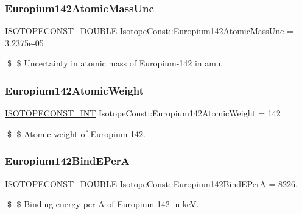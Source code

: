 \subsubsection{\texorpdfstring{Europium142\+Atomic\+Mass\+Unc}{Europium142AtomicMassUnc}}
{\footnotesize\ttfamily \mbox{\hyperlink{group___isotope_const-_macros_ga8f45a7272ce02c0b4c65c44636ed719a}{I\+S\+O\+T\+O\+P\+E\+C\+O\+N\+S\+T\+\_\+\+D\+O\+U\+B\+LE}} Isotope\+Const\+::\+Europium142\+Atomic\+Mass\+Unc = 3.\+2375e-\/05}

\$ \$ Uncertainty in atomic mass of Europium-\/142 in amu. \mbox{\label{group___isotope_const-_europium-_eu142_ga86106d6a46dceef58f7110298a46e142}} 
\subsubsection{\texorpdfstring{Europium142\+Atomic\+Weight}{Europium142AtomicWeight}}
{\footnotesize\ttfamily \mbox{\hyperlink{group___isotope_const-_macros_ga5f18360b3e99483a35c32d789e62621c}{I\+S\+O\+T\+O\+P\+E\+C\+O\+N\+S\+T\+\_\+\+I\+NT}} Isotope\+Const\+::\+Europium142\+Atomic\+Weight = 142}

\$ \$ Atomic weight of Europium-\/142. \mbox{\label{group___isotope_const-_europium-_eu142_ga02055365030ecb4e028ccd3c394f8ca9}} 
\subsubsection{\texorpdfstring{Europium142\+Bind\+E\+PerA}{Europium142BindEPerA}}
{\footnotesize\ttfamily \mbox{\hyperlink{group___isotope_const-_macros_ga8f45a7272ce02c0b4c65c44636ed719a}{I\+S\+O\+T\+O\+P\+E\+C\+O\+N\+S\+T\+\_\+\+D\+O\+U\+B\+LE}} Isotope\+Const\+::\+Europium142\+Bind\+E\+PerA = 8226.}

\$ \$ Binding energy per A of Europium-\/142 in keV. \mbox{\label{group___isotope_const-_europium-_eu142_gaffffbc6203c61fddf85ef0e51bcdeada}} 
